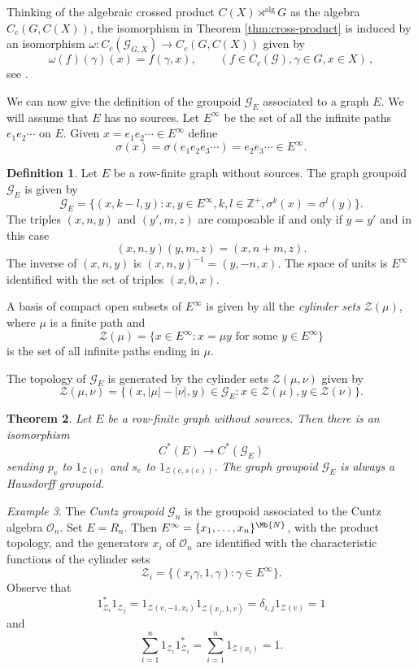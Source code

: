 \documentclass[11pt]{amsart}
\def\N{\mathbb{N}}
\newcommand{\alrtimes}{\rtimes^{\mathrm{alg}}}
\theoremstyle{plain}            %
\newtheorem{theorem}{Theorem}[section]
\theoremstyle{definition}       %
\newtheorem{definition}[theorem]{Definition}
\theoremstyle{definition}       %
\theoremstyle{remark}
\newtheorem{example}[theorem]{Example}
\def\Z{\mathbb{Z}}
\def\N{\mathbb{N}}
\def\N{\Mb{N}}
\def\N{\Mb{N}}
\begin{document}
Thinking of the algebraic crossed product $C(X)\alrtimes G$ as the algebra $C_c(G, C(X))$, the isomorphism in Theorem \ref{thm:cross-product} is induced by an isomorphism $\omega\colon C_c (\mathcal G_{G,X})\to C_c(G,C(X))$ given by
$$\omega (f)(\gamma) (x)= f(\gamma,x),\qquad (f\in C_c(\mathcal G), \gamma \in G, x\in X)\, ,$$
see \cite[Example 9.1.7]{SimsCRMNotes}. 

We can now give the definition of the groupoid $\mathcal G _E$ associated to a graph $E$. We will assume that $E$ has no sources. Let $E^{\infty}$ be the set of all the infinite paths $e_1e_2\cdots $ on $E$. Given $x= e_1e_2\cdots \in E^{\infty}$ define
$$\sigma (x) =  \sigma (e_1e_2e_3 \cdots ) = e_2e_3\cdots \in E^{\infty}.$$ 

\begin{definition}
	\label{def:graph-groupoid}
	Let $E$ be a row-finite graph without sources.  The graph groupoid $\mathcal G_E$ is given by
	$$\mathcal G_E = \{(x,k-l,y): x,y\in E^{\infty}, k,l\in \Z^+, \sigma^k(x) = \sigma^l (y)\}.$$
	The triples $(x,n,y)$ and $(y',m,z)$ are composable if and only if $y=y'$ and in this case
	$$(x,n,y)(y,m,z) = (x,n+m,z).$$
	The inverse of $(x,n,y)$ is $(x,n,y)^{-1} = (y,-n,x)$. The space of units is $E^{\infty}$ identified with the set of triples $(x,0,x)$.
	
	A basis of compact open subsets of $E^\infty$ is given by all the {\it cylinder sets} $\mathcal Z (\mu)$, where $\mu$ is a finite path and 
	$$\mathcal Z (\mu) = \{ x\in E^{\infty} : x= \mu y \text{ for some } y\in E^\infty\}$$
	is the set of all infinite paths ending in $\mu$. 
	
	
	The topology of $\mathcal G_E$ is generated by the cylinder sets $\mathcal Z (\mu,\nu)$ given by
	$$\mathcal Z (\mu,\nu) = \{ (x,|\mu| - |\nu|,y) \in \mathcal G_E : x\in \mathcal Z (\mu), y\in \mathcal Z (\nu)\}.$$
\end{definition}


\begin{theorem}
	\label{thm:isomorphism-groupoid-graph}
	Let $E$ be a row-finite graph without sources. Then there is an isomorphism
	$$C^*(E)  \to C^*(\mathcal G_E)$$
	sending $p_v$ to $1_{\mathcal Z (v)}$ and $s_e$ to $1_{\mathcal Z (e,s(e))}$. 
	The graph groupoid $\mathcal G_E$ is always a Hausdorff groupoid. 
\end{theorem}


\begin{example}
	The {\it Cuntz groupoid} $\mathcal G_n$ is the groupoid associated to the Cuntz algebra $\mathcal O_n$.
	Set $E=R_n$. Then $E^\infty = \{x_1,\dots , x_n\}^{\N}$, with the product topology, and the generators $x_i$ of $\mathcal O_n$ are identified with the characteristic functions of the cylinder sets 
	$$\mathcal Z_i = \{(x_i \gamma , 1,  \gamma ) :  \gamma \in E^\infty\}.$$
	Observe that 
	$$1_{\mathcal Z_i}^*1_{\mathcal Z_j} = 1_{\mathcal Z (v,-1,x_i)}1_{\mathcal Z (x_j,1,v)} = \delta_{i,j} 1_{\mathcal Z(v)} = 1$$
	and 
	$$\sum_{i=1}^n 1_{\mathcal Z_i}1_{\mathcal Z_i}^* = \sum_{i=1}^n 1_{\mathcal Z (x_i)} = 1.$$  
\end{example}
\end{document}
